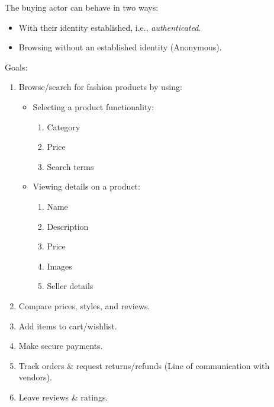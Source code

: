 \documentclass[a4paper,12pt]{article}
\begin{document}
The buying actor can behave in two ways:

\begin{itemize}
    \item With their identity established, i.e., \emph{authenticated}.
    \item Browsing without an established identity (Anonymous).
\end{itemize}


Goals:

\begin{enumerate}
    \item Browse/search for fashion products by using:
          \begin{itemize}
              \item Selecting a product functionality:
                    \begin{enumerate}
                        \item Category
                        \item Price
                        \item Search terms
                    \end{enumerate}
              \item Viewing details on a product:
                    \begin{enumerate}
                        \item Name
                        \item Description
                        \item Price
                        \item Images
                        \item Seller details
                    \end{enumerate}
          \end{itemize}


    \item Compare prices, styles, and reviews.

    \item Add items to cart/wishlist.

    \item Make secure payments.

    \item Track orders \& request returns/refunds (Line of communication with vendors).

    \item Leave reviews \& ratings.
\end{enumerate}
\end{document}
